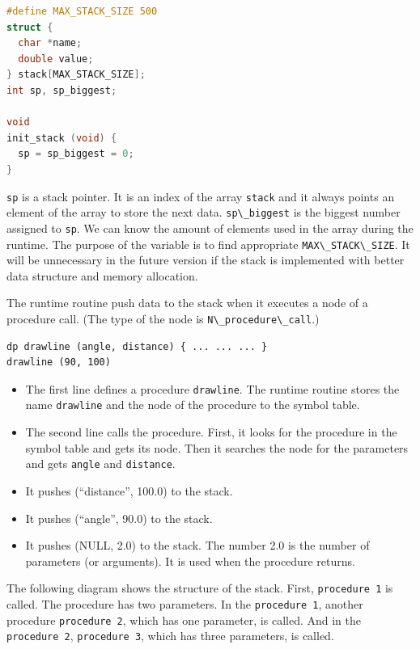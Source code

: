 \begin{lstlisting}[language=C]
#define MAX_STACK_SIZE 500
struct {
  char *name;
  double value;
} stack[MAX_STACK_SIZE];
int sp, sp_biggest;

void
init_stack (void) {
  sp = sp_biggest = 0;
}
\end{lstlisting}

\passthrough{\lstinline!sp!} is a stack pointer. It is an index of the
array \passthrough{\lstinline!stack!} and it always points an element of
the array to store the next data. \passthrough{\lstinline!sp\_biggest!}
is the biggest number assigned to \passthrough{\lstinline!sp!}. We can
know the amount of elements used in the array during the runtime. The
purpose of the variable is to find appropriate
\passthrough{\lstinline!MAX\_STACK\_SIZE!}. It will be unnecessary in
the future version if the stack is implemented with better data
structure and memory allocation.

The runtime routine push data to the stack when it executes a node of a
procedure call. (The type of the node is
\passthrough{\lstinline!N\_procedure\_call!}.)

\begin{lstlisting}
dp drawline (angle, distance) { ... ... ... }
drawline (90, 100)
\end{lstlisting}

\begin{itemize}
\tightlist
\item
  The first line defines a procedure \passthrough{\lstinline!drawline!}.
  The runtime routine stores the name \passthrough{\lstinline!drawline!}
  and the node of the procedure to the symbol table.
\item
  The second line calls the procedure. First, it looks for the procedure
  in the symbol table and gets its node. Then it searches the node for
  the parameters and gets \passthrough{\lstinline!angle!} and
  \passthrough{\lstinline!distance!}.
\item
  It pushes (``distance'', 100.0) to the stack.
\item
  It pushes (``angle'', 90.0) to the stack.
\item
  It pushes (NULL, 2.0) to the stack. The number 2.0 is the number of
  parameters (or arguments). It is used when the procedure returns.
\end{itemize}

The following diagram shows the structure of the stack. First,
\passthrough{\lstinline!procedure 1!} is called. The procedure has two
parameters. In the \passthrough{\lstinline!procedure 1!}, another
procedure \passthrough{\lstinline!procedure 2!}, which has one
parameter, is called. And in the \passthrough{\lstinline!procedure 2!},
\passthrough{\lstinline!procedure 3!}, which has three parameters, is
called.

